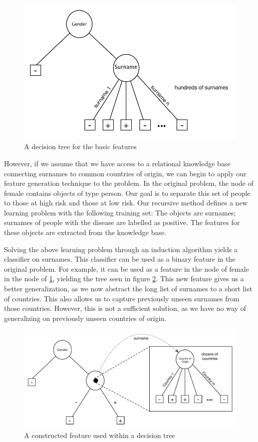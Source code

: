\documentclass{article}
\theoremstyle{definition}
\begin{document}
\begin{figure}
	\centering
	\includegraphics[width=\linewidth]{fig1.pdf}
	\caption{A decision tree for the basic features}
	\label{fig:tree_base}
\end{figure}

However, if we assume that we have access to a relational knowledge base connecting surnames to common countries of origin, we can begin to apply our feature generation technique to the problem. In the original problem, the node of female contains objects of type person. Our goal is to separate this set of people to those at high risk and those at low risk. Our recursive method defines a new learning problem with the following training set: The objects are surnames; surnames of people with the disease are labelled as positive. The features for these objects are extracted from the knowledge base.

Solving the above learning problem through an induction algorithm yields a classifier on surnames. This classifier can be used as a binary feature in the original problem. For example, it can be used as a feature in the node of female in the node of \ref{fig:tree_base}, yielding the tree seen in figure \ref{fig:lvl1_tree}. This new feature gives us a better generalization, as we now abstract the long list of surnames to a short list of countries. This also allows us to capture previously unseen surnames from those countries. However, this is not a sufficient solution, as we have no way of generalizing on previously unseen countries of origin.

\begin{figure}
	\centering
	\includegraphics[width=\linewidth]{fig2.pdf}
	\caption{A constructed feature used within a decision tree}
	\label{fig:lvl1_tree}
\end{figure}
\end{document}
